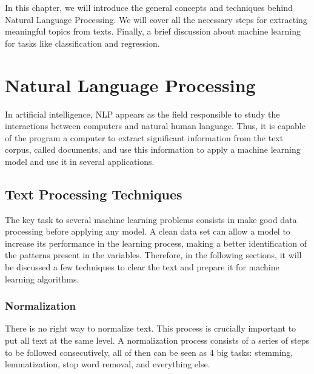 In this chapter, we will introduce the general concepts and techniques behind Natural Language Processing. We will cover all the necessary steps for extracting meaningful topics from texts. Finally, a brief discussion about machine learning for tasks like classification and regression.


\section{Natural Language Processing}

	In artificial intelligence, NLP appears as the field responsible to study the interactions between computers and natural human language. Thus, it is capable of the program a computer to extract significant information from the text corpus, called documents, and use this information to apply a machine learning model and use it in several applications. 

	\subsection{Text Processing Techniques}\label{sec:text-processing}
	
	The key task to several machine learning problems consists in make good data processing before applying any model. A clean data set can allow a model to increase its performance in the learning process, making a better identification of the patterns present in the variables. Therefore, in the following sections, it will be discussed a few techniques to clear the text and prepare it for machine learning algorithms.
	
	\subsubsection{Normalization}
	
	There is no right way to normalize text. This process is crucially important to put all text at the same level. A normalization process consists of a series of steps to be followed consecutively, all of then can be seen as 4 big tasks: stemming, lemmatization, stop word removal, and everything else.
	
